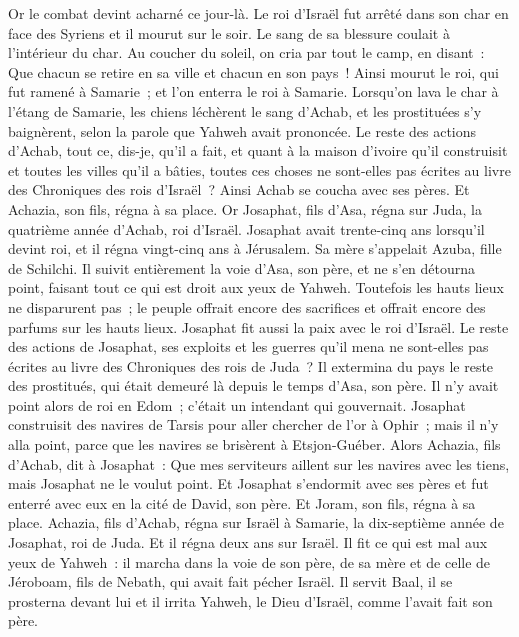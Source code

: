\begin{multicols}{2}
Or le combat devint acharné ce jour-là. Le roi d'Israël fut arrêté dans son char en face des Syriens et il mourut sur le soir. Le sang de sa blessure coulait à l'intérieur du char.
Au coucher du soleil, on cria par tout le camp, en disant~: Que chacun se retire en sa ville et chacun en son pays~!
Ainsi mourut le roi, qui fut ramené à Samarie~; et l'on enterra le roi à Samarie.
Lorsqu'on lava le char à l'étang de Samarie, les chiens léchèrent le sang d'Achab, et les prostituées s'y baignèrent, selon la parole que Yahweh avait prononcée.
Le reste des actions d'Achab, tout ce, dis-je, qu'il a fait, et quant à la maison d'ivoire qu'il construisit et toutes les villes qu'il a bâties, toutes ces choses ne sont-elles pas écrites au livre des Chroniques des rois d'Israël~?
Ainsi Achab se coucha avec ses pères. Et Achazia, son fils, régna à sa place.
Or Josaphat, fils d'Asa, régna sur Juda, la quatrième année d'Achab, roi d'Israël.
Josaphat avait trente-cinq ans lorsqu'il devint roi, et il régna vingt-cinq ans à Jérusalem. Sa mère s'appelait Azuba, fille de Schilchi.
Il suivit entièrement la voie d'Asa, son père, et ne s'en détourna point, faisant tout ce qui est droit aux yeux de Yahweh.
Toutefois les hauts lieux ne disparurent pas~; le peuple offrait encore des sacrifices et offrait encore des parfums sur les hauts lieux.
Josaphat fit aussi la paix avec le roi d'Israël.
Le reste des actions de Josaphat, ses exploits et les guerres qu'il mena ne sont-elles pas écrites au livre des Chroniques des rois de Juda~?
Il extermina du pays le reste des prostitués, qui était demeuré là depuis le temps d'Asa, son père.
Il n'y avait point alors de roi en Edom~; c'était un intendant qui gouvernait.
Josaphat construisit des navires de Tarsis pour aller chercher de l'or à Ophir~; mais il n'y alla point, parce que les navires se brisèrent à Etsjon-Guéber.
Alors Achazia, fils d'Achab, dit à Josaphat~: Que mes serviteurs aillent sur les navires avec les tiens, mais Josaphat ne le voulut point.
Et Josaphat s'endormit avec ses pères et fut enterré avec eux en la cité de David, son père. Et Joram, son fils, régna à sa place.
Achazia, fils d'Achab, régna sur Israël à Samarie, la dix-septième année de Josaphat, roi de Juda. Et il régna deux ans sur Israël.
Il fit ce qui est mal aux yeux de Yahweh~: il marcha dans la voie de son père, de sa mère et de celle de Jéroboam, fils de Nebath, qui avait fait pécher Israël.
Il servit Baal, il se prosterna devant lui et il irrita Yahweh, le Dieu d'Israël, comme l'avait fait son père.
\PPE{}
\end{multicols}
